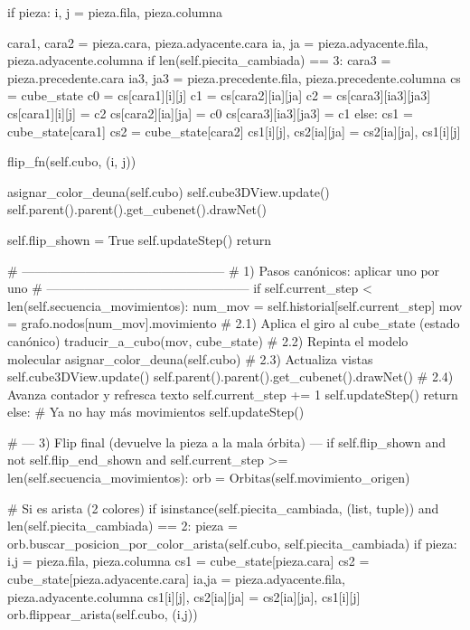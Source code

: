             if pieza:
                i, j = pieza.fila, pieza.columna

                cara1, cara2 = pieza.cara, pieza.adyacente.cara
                ia, ja = pieza.adyacente.fila, pieza.adyacente.columna
                if len(self.piecita_cambiada) == 3:
                    cara3 = pieza.precedente.cara
                    ia3, ja3 = pieza.precedente.fila, pieza.precedente.columna
                    cs = cube_state
                    c0 = cs[cara1][i][j]
                    c1 = cs[cara2][ia][ja]
                    c2 = cs[cara3][ia3][ja3]
                    cs[cara1][i][j] = c2
                    cs[cara2][ia][ja] = c0
                    cs[cara3][ia3][ja3] = c1
                else:
                    cs1 = cube_state[cara1]
                    cs2 = cube_state[cara2]
                    cs1[i][j], cs2[ia][ja] = cs2[ia][ja], cs1[i][j]

                flip_fn(self.cubo, (i, j))

                asignar_color_deuna(self.cubo)
                self.cube3DView.update()
                self.parent().parent().get_cubenet().drawNet()

            self.flip_shown = True
            self.updateStep()
            return

        # ------------------------------------------------
        # 1) Pasos canónicos: aplicar uno por uno
        # ------------------------------------------------
        if self.current_step < len(self.secuencia_movimientos):
            num_mov = self.historial[self.current_step]
            mov = grafo.nodos[num_mov].movimiento
            # 2.1) Aplica el giro al cube_state (estado canónico)
            traducir_a_cubo(mov, cube_state)
            # 2.2) Repinta el modelo molecular
            asignar_color_deuna(self.cubo)
            # 2.3) Actualiza vistas
            self.cube3DView.update()
            self.parent().parent().get_cubenet().drawNet()
            # 2.4) Avanza contador y refresca texto
            self.current_step += 1
            self.updateStep()
            return
        else:
            # Ya no hay más movimientos
            self.updateStep()
            
        # --- 3) Flip final (devuelve la pieza a la mala órbita) ---
        if self.flip_shown and not self.flip_end_shown and self.current_step >= len(self.secuencia_movimientos):
            orb = Orbitas(self.movimiento_origen)

            # Si es arista (2 colores)
            if isinstance(self.piecita_cambiada, (list, tuple)) and len(self.piecita_cambiada) == 2:
                pieza = orb.buscar_posicion_por_color_arista(self.cubo, self.piecita_cambiada)
                if pieza:
                    i,j = pieza.fila, pieza.columna
                    cs1 = cube_state[pieza.cara]
                    cs2 = cube_state[pieza.adyacente.cara]
                    ia,ja = pieza.adyacente.fila, pieza.adyacente.columna
                    cs1[i][j], cs2[ia][ja] = cs2[ia][ja], cs1[i][j]
                    orb.flippear_arista(self.cubo, (i,j))

